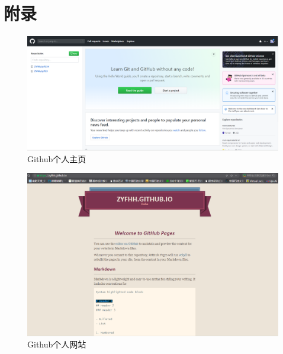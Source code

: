 \documentclass{article}
\begin{document}
\section{附录}
	\begin{figure}[h!]
	\centering
	\includegraphics[scale=0.4]{github1.PNG}
	\caption{Github个人主页}
	\label{fig:gwrqc.jpg}
\end{figure}

\begin{figure}[h!]
	\centering
	\includegraphics[scale=0.5]{github2.PNG}
	\caption{Github个人网站}
	\label{fig:ggrqc.jpg}
\end{figure}
\end{document}
